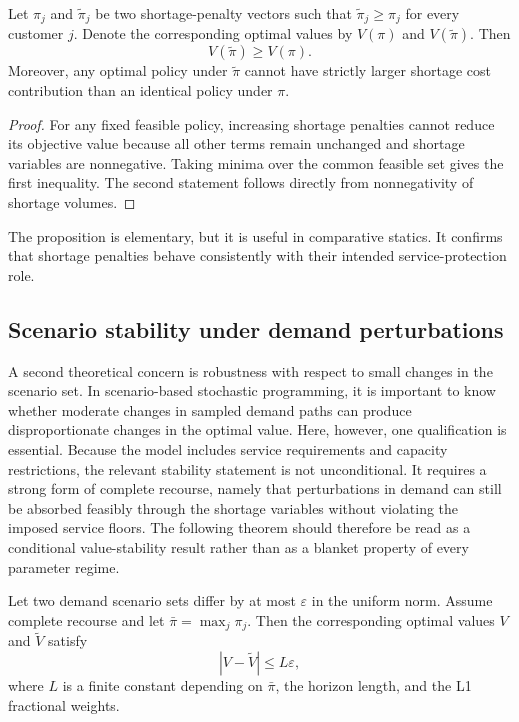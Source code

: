 \begin{proposition}
Let $\pi_j$ and $\widetilde\pi_j$ be two shortage-penalty vectors such that $\widetilde\pi_j\ge \pi_j$ for every customer $j$. Denote the corresponding optimal values by $V(\pi)$ and $V(\widetilde\pi)$. Then
\begin{equation}
V(\widetilde\pi)\ge V(\pi).
\end{equation}
Moreover, any optimal policy under $\widetilde\pi$ cannot have strictly larger shortage cost contribution than an identical policy under $\pi$.
\end{proposition}

\begin{proof}
For any fixed feasible policy, increasing shortage penalties cannot reduce its objective value because all other terms remain unchanged and shortage variables are nonnegative. Taking minima over the common feasible set gives the first inequality. The second statement follows directly from nonnegativity of shortage volumes.
\end{proof}

The proposition is elementary, but it is useful in comparative statics. It confirms that shortage penalties behave consistently with their intended service-protection role.

\subsection{Scenario stability under demand perturbations}
A second theoretical concern is robustness with respect to small changes in the scenario set. In scenario-based stochastic programming, it is important to know whether moderate changes in sampled demand paths can produce disproportionate changes in the optimal value. Here, however, one qualification is essential. Because the model includes service requirements and capacity restrictions, the relevant stability statement is not unconditional. It requires a strong form of complete recourse, namely that perturbations in demand can still be absorbed feasibly through the shortage variables without violating the imposed service floors. The following theorem should therefore be read as a conditional value-stability result rather than as a blanket property of every parameter regime.

\begin{theorem}
Let two demand scenario sets differ by at most $\varepsilon$ in the uniform norm. Assume complete recourse and let $\bar\pi=\max_j \pi_j$. Then the corresponding optimal values $V$ and $\widetilde V$ satisfy
\begin{equation}
|V-\widetilde V|\le L\varepsilon,
\end{equation}
where $L$ is a finite constant depending on $\bar\pi$, the horizon length, and the L1 fractional weights.
\end{theorem}

